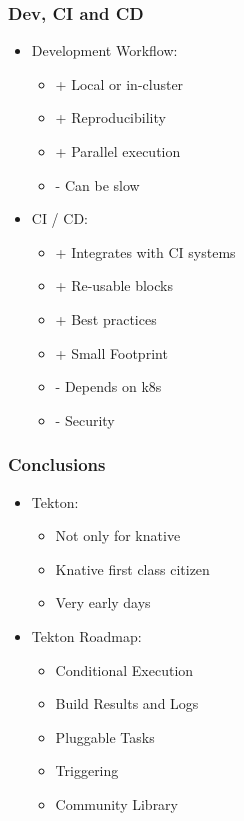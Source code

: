 \documentclass[aspectratio=169,11pt,hyperref={colorlinks=true}]{beamer}
\begin{document}
\begin{lblackrwhiteframe}
\begin{lblackrwhiteframe}
\begin{blackframe}
\begin{grayframe}
  \frametitle{Dev, CI and CD}
  \begin{itemize}
    \item Development Workflow:
    \begin{itemize}
      \item + Local or in-cluster
      \item + Reproducibility
      \item + Parallel execution
      \item - Can be slow
    \end{itemize}
    \item CI / CD:
    \begin{itemize}
      \item + Integrates with CI systems
      \item + Re-usable blocks
      \item + Best practices
      \item + Small Footprint
      \item - Depends on k8s
      \item - Security
    \end{itemize}
  \end{itemize}
\end{grayframe}

\begin{grayframe}
  \frametitle{Conclusions}
  \begin{itemize}
    \item Tekton:
    \begin{itemize}
      \item Not only for knative
      \item Knative first class citizen
      \item Very early days
    \end{itemize}
    \item Tekton Roadmap:
    \begin{itemize}
      \item Conditional Execution
      \item Build Results and Logs
      \item Pluggable Tasks
      \item Triggering
      \item Community Library
    \end{itemize}
  \end{itemize}
\end{grayframe}


\end{blackframe}
\end{lblackrwhiteframe}
\end{lblackrwhiteframe}
\end{document}
